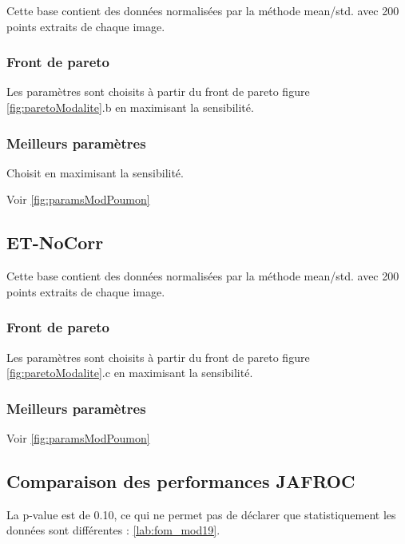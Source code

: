 Cette base contient des données normalisées par la méthode mean/std. avec 200 points extraits de chaque image.

\subsubsection{Front de pareto}

Les paramètres sont choisits à partir du front de pareto figure \ref{fig:paretoModalite}.b en maximisant la sensibilité.


\subsubsection{Meilleurs paramètres}

Choisit en maximisant la sensibilité.

Voir \ref{fig:paramsModPoumon}

\subsection{ET-NoCorr}

Cette base contient des données normalisées par la méthode mean/std. avec 200 points extraits de chaque image.

\subsubsection{Front de pareto}

Les paramètres sont choisits à partir du front de pareto figure \ref{fig:paretoModalite}.c en maximisant la sensibilité.

\subsubsection{Meilleurs paramètres}

Voir \ref{fig:paramsModPoumon}

\subsection{Comparaison des performances JAFROC}

La p-value est de 0.10, ce qui ne permet pas de déclarer que statistiquement les données sont différentes : \ref{lab:fom_mod19}.

